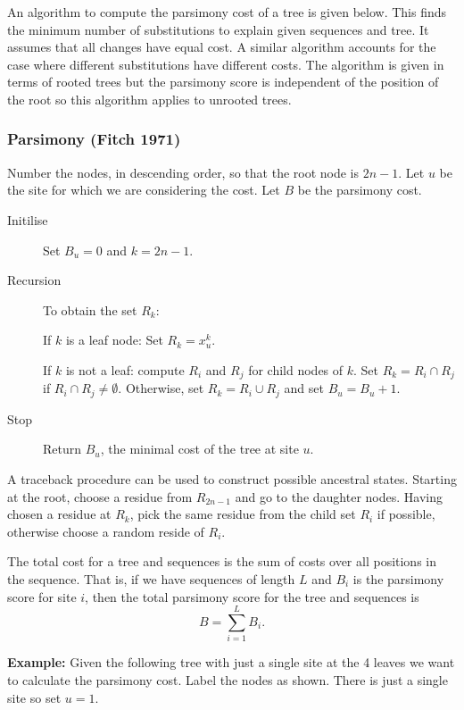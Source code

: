 \documentclass[11pt]{article}
\begin{document}
An algorithm to compute the parsimony cost of a tree is given below.  This finds the minimum number of substitutions to explain given sequences and tree.  It assumes that all changes have equal cost. A similar algorithm accounts for the case where different substitutions have different costs.  The algorithm is given in terms of rooted trees but the parsimony score is independent of the position of the root so this algorithm applies to unrooted trees.


\subsubsection*{Parsimony (Fitch 1971)}

Number the nodes, in descending order, so that the root node is $2n-1$.  Let $u$ be the site for which we are considering the cost. Let $B$ be the parsimony cost.

\begin{description}
\item[Initilise] Set $B_u = 0$ and $k = 2n-1$.
\item[Recursion] To obtain the set $R_k$:

If $k$ is a leaf node: Set $R_k = x^k_u$.

If $k$ is not a leaf: compute $R_i$ and $R_j$ for child nodes of $k$.  Set $R_k = R_i \cap R_j$ if $R_i \cap R_j \neq \emptyset$.  Otherwise,  set $R_k = R_i \cup R_j$ and set $B_u = B_u+1$.
\item[Stop] Return  $B_u$, the minimal cost of the tree at site $u$.
\end{description}



A traceback procedure can be used to construct possible ancestral states.  Starting at the root, choose a residue from $R_{2n-1}$ and go to the daughter nodes.  Having chosen a residue at $R_k$, pick the same residue from the child set $R_i$ if possible, otherwise choose a random reside of $R_i$.  

The total cost for a tree and sequences is the sum of costs over all positions in the sequence. That is, if we have sequences of length $L$ and $B_i$ is the parsimony score for site $i$, then the total parsimony score for the tree and sequences is 
\[ B = \sum_{i = 1}^L B_i. \]

{\bf Example:} Given the following tree with just a single site at the 4 leaves we want to calculate the parsimony cost.   Label the nodes as shown.  There is just a single site so set $u = 1$.  
\end{document}
